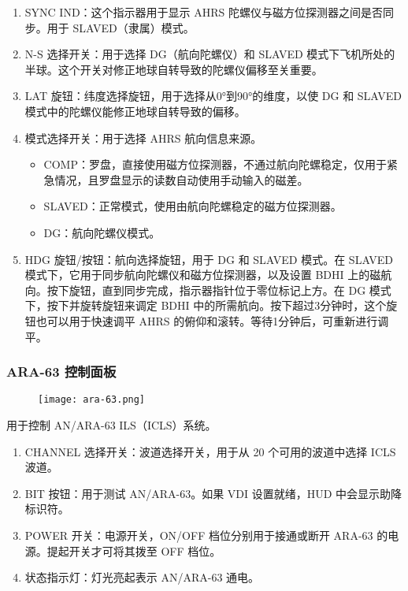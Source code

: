 \begin{enumerate}
  \item SYNC IND：这个指示器用于显示 AHRS 陀螺仪与磁方位探测器之间是否同步。用于 SLAVED（隶属）模式。
  \item N-S 选择开关：用于选择 DG（航向陀螺仪）和 SLAVED 模式下飞机所处的半球。这个开关对修正地球自转导致的陀螺仪偏移至关重要。
  \item LAT 旋钮：纬度选择旋钮，用于选择从0°到90°的维度，以使 DG 和 SLAVED 模式中的陀螺仪能修正地球自转导致的偏移。
  \item 模式选择开关：用于选择 AHRS 航向信息来源。
  \begin{itemize}
    \item COMP：罗盘，直接使用磁方位探测器，不通过航向陀螺稳定，仅用于紧急情况，且罗盘显示的读数自动使用手动输入的磁差。
    \item SLAVED：正常模式，使用由航向陀螺稳定的磁方位探测器。
    \item DG：航向陀螺仪模式。
  \end{itemize}
  \item HDG 旋钮/按钮：航向选择旋钮，用于 DG 和 SLAVED 模式。在 SLAVED 模式下，它用于同步航向陀螺仪和磁方位探测器，以及设置 BDHI 上的磁航向。按下旋钮，直到同步完成，指示器指针位于零位标记上方。在 DG 模式下，按下并旋转旋钮来调定 BDHI 中的所需航向。按下超过3分钟时，这个旋钮也可以用于快速调平 AHRS 的俯仰和滚转。等待1分钟后，可重新进行调平。
\end{enumerate}

\subsubsection{ARA-63 控制面板}

\begin{figure}[htb]
  \center
  \texttt{[image: ara-63.png]}
\end{figure}
用于控制 AN/ARA-63 ILS（ICLS）系统。

\begin{enumerate}
  \item CHANNEL 选择开关：波道选择开关，用于从 20 个可用的波道中选择 ICLS 波道。
  \item BIT 按钮：用于测试 AN/ARA-63。如果 VDI 设置就绪，HUD 中会显示助降标识符。
  \item POWER 开关：电源开关，ON/OFF 档位分别用于接通或断开 ARA-63 的电源。提起开关才可将其拨至 OFF 档位。
  \item 状态指示灯：灯光亮起表示 AN/ARA-63 通电。
\end{enumerate}

